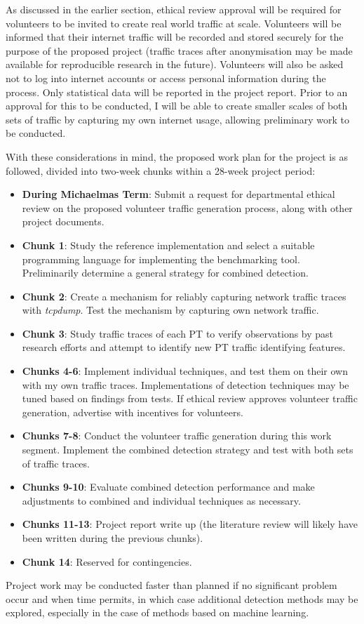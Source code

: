 \documentclass[11pt]{article}
\begin{document}
As discussed in the earlier section, ethical review approval will be required for volunteers to be invited to create real world traffic at scale. Volunteers will be informed that their internet traffic will be recorded and stored securely for the purpose of the proposed project (traffic traces after anonymisation may be made available for reproducible research in the future). Volunteers will also be asked not to log into internet accounts or access personal information during the process. Only statistical data will be reported in the project report. Prior to an approval for this to be conducted, I will be able to create smaller scales of both sets of traffic by capturing my own internet usage, allowing preliminary work to be conducted. 

With these considerations in mind, the proposed work plan for the project is as followed, divided into two-week chunks within a 28-week project period:

\begin{itemize}
	\item \textbf{During Michaelmas Term}: Submit a request for departmental ethical review on the proposed volunteer traffic generation process, along with other project documents.
	\item \textbf{Chunk 1}: Study the reference implementation and select a suitable programming language for implementing the benchmarking tool. Preliminarily determine a general strategy for combined detection.
	\item \textbf{Chunk 2}: Create a mechanism for reliably capturing network traffic traces with \emph{tcpdump}. Test the mechanism by capturing own network traffic.
	\item \textbf{Chunk 3}: Study traffic traces of each PT to verify observations by past research efforts and attempt to identify new PT traffic identifying features.
	\item \textbf{Chunks 4-6}: Implement individual techniques, and test them on their own with my own traffic traces. Implementations of detection techniques may be tuned based on findings from tests.  If ethical review approves volunteer traffic generation, advertise with incentives for volunteers.
	\item \textbf{Chunks 7-8}: Conduct the volunteer traffic generation during this work segment. Implement the combined detection strategy and test with both sets of traffic traces. 
	\item \textbf{Chunks 9-10}: Evaluate combined detection performance and make adjustments to combined and individual techniques as necessary.
	\item \textbf{Chunks 11-13}: Project report write up (the literature review will likely have been written during the previous chunks).
	\item \textbf{Chunk 14}: Reserved for contingencies.
\end{itemize}

Project work may be conducted faster than planned if no significant problem occur and when time permits, in which case additional detection methods may be explored, especially in the case of methods based on machine learning.


\footnotesize{}
\end{document}
